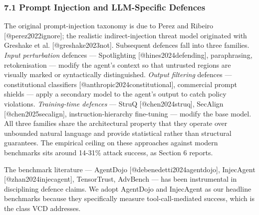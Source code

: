 \subsubsection{7.1 Prompt Injection and LLM-Specific
Defences}\label{prompt-injection-and-llm-specific-defences}

The original prompt-injection taxonomy is due to Perez and Ribeiro
{[}@perez2022ignore{]}; the realistic indirect-injection threat model
originated with Greshake et al. {[}@greshake2023not{]}. Subsequent
defences fall into three families. \emph{Input perturbation} defences
--- Spotlighting {[}@hines2024defending{]}, paraphrasing, retokenisation
--- modify the agent's context so that untrusted regions are visually
marked or syntactically distinguished. \emph{Output filtering} defences
--- constitutional classifiers {[}@anthropic2024constitutional{]},
commercial prompt shields --- apply a secondary model to the agent's
output to catch policy violations. \emph{Training-time defences} ---
StruQ {[}@chen2024struq{]}, SecAlign {[}@chen2025secalign{]},
instruction-hierarchy fine-tuning --- modify the base model. All three
families share the architectural property that they operate over
unbounded natural language and provide statistical rather than
structural guarantees. The empirical ceiling on these approaches against
modern benchmarks sits around 14-31\% attack success, as Section 6
reports.

The benchmark literature --- AgentDojo {[}@debenedetti2024agentdojo{]},
InjecAgent {[}@zhan2024injecagent{]}, TensorTrust, AdvBench --- has been
instrumental in disciplining defence claims. We adopt AgentDojo and
InjecAgent as our headline benchmarks because they specifically measure
tool-call-mediated success, which is the class VCD addresses.

